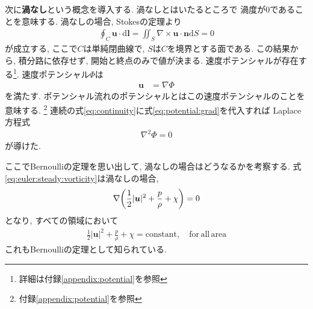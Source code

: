 \documentclass{ltjsarticle}
\begin{document}
次に\textbf{渦なし}という概念を導入する. 渦なしとはいたるところで
渦度が0であることを意味する. 
渦なしの場合, Stokesの定理より
\begin{align}
    \oint_{C} \bm{u}\cdot\mathrm{d}\bm{l} 
    = \iint_S\nabla\times\bm{u}\cdot\bm{n}\mathrm{d}S =0
    \label{eq:stokes:zero}
\end{align}
が成立する, 
ここで$C$は単純閉曲線で, $S$は$C$を境界とする面である. 
この結果から, 積分路に依存せず, 開始と終点のみで値が決まる.
速度ポテンシャルが存在する\footnote{詳細は付録\ref{appendix:potential}を参照}.
速度ポテンシャル$\Phi$は
\begin{align}
    \bm{u} &= \nabla\Phi \label{eq:potential:grad}
\end{align}
を満たす.
ポテンシャル流れのポテンシャルとはこの速度ポテンシャルのことを意味する.
\footnote{付録\ref{appendix:potential}を参照}
連続の式\eqref{eq:continuity}に式\eqref{eq:potential:grad}を代入すれば
Laplace方程式
\begin{align}
    \nabla^2\Phi = 0 \label{eq:laplace}
\end{align}
が導けた.

ここでBernoulliの定理を思い出して, 渦なしの場合はどうなるかを考察する.
式\eqref{eq:euler:steady:vorticity}は渦なしの場合,
\begin{align}
    \nabla\qty(\frac{1}{2}|\bm{u}|^2 + \frac{p}{\rho}+\chi) = 0
\end{align}
となり, すべての領域において
\begin{align}
    \frac{1}{2}|\bm{u}|^2 + \frac{p}{\rho}+\chi = \mathrm{constant},\quad \mathrm{for\,all\,area}
    \label{eq:bernoulli:no_vorticity}
\end{align}
これもBernoulliの定理として知られている.
\end{document}
